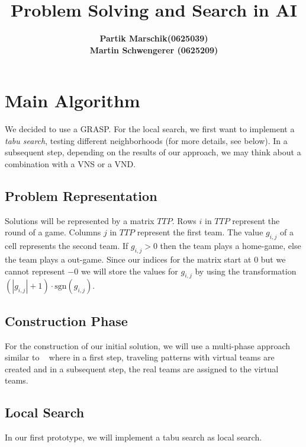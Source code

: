 \documentclass[a4paper,11pt]{article}
\title{ \LARGE \bf Problem Solving and Search in AI }
\author{
\bf Partik Marschik(0625039) \\
\bf Martin Schwengerer (0625209) }
\begin{document}
\maketitle

\section{Main Algorithm}
We decided to use a \ac{GRASP}. For the local search, we first want to implement a \emph{tabu search}, testing different neighborhoods (for more details, see below). In a subsequent step, depending on the results of our approach, we may think about a combination with a \ac{VNS} or a \ac{VND}.



\subsection{Problem Representation}
Solutions will be represented by a matrix $TTP$.
Rows $i$ in $TTP$ represent the round of a game.
Columns $j$ in $TTP$ represent the first team.
The value $g_{i,j}$ of a cell represents the second team.
If $g_{i,j} > 0$ then the team plays a home-game, else the team plays a out-game.
Since our indices for the matrix start at $0$ but we cannot represent $-0$ we will
store the values for $g_{i,j}$ by using the transformation
$(|g_{i,j}| + 1) \cdot \text{sgn}(g_{i,j})$.

\subsection{Construction Phase}
For the construction of our initial solution, we will use a multi-phase approach similar to ~\cite{Ribeiro04heuristicsfor} where in a first step, traveling patterns with virtual teams are created and in a subsequent step, the real teams are assigned to the virtual teams.

\subsection{Local Search}
In our first prototype, we will implement a tabu search as local search.
\end{document}
